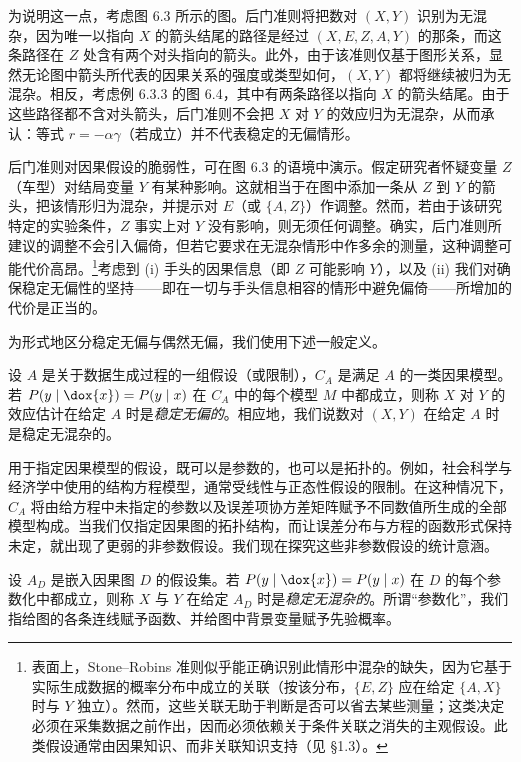 为说明这一点，考虑图 6.3 所示的图。后门准则将把数对 $(X,Y)$ 识别为无混杂，因为唯一以指向 $X$ 的箭头结尾的路径是经过 $(X,E,Z,A,Y)$ 的那条，而这条路径在 $Z$ 处含有两个对头指向的箭头。此外，由于该准则仅基于图形关系，显然无论图中箭头所代表的因果关系的强度或类型如何，$(X,Y)$ 都将继续被归为无混杂。相反，考虑例 6.3.3 的图 6.4，其中有两条路径以指向 $X$ 的箭头结尾。由于这些路径都不含对头箭头，后门准则不会把 $X$ 对 $Y$ 的效应归为无混杂，从而承认：等式 $r=-\alpha\gamma$（若成立）并不代表稳定的无偏情形。

后门准则对因果假设的脆弱性，可在图 6.3 的语境中演示。假定研究者怀疑变量 $Z$（车型）对结局变量 $Y$ 有某种影响。这就相当于在图中添加一条从 $Z$ 到 $Y$ 的箭头，把该情形归为混杂，并提示对 $E$（或 $\{A,Z\}$）作调整。然而，若由于该研究特定的实验条件，$Z$ 事实上对 $Y$ 没有影响，则无须任何调整。确实，后门准则所建议的调整不会引入偏倚，但若它要求在无混杂情形中作多余的测量，这种调整可能代价高昂。\footnote{表面上，Stone–Robins 准则似乎能正确识别此情形中混杂的缺失，因为它基于实际生成数据的概率分布中成立的关联（按该分布，$\{E,Z\}$ 应在给定 $\{A,X\}$ 时与 $Y$ 独立）。然而，这些关联无助于判断是否可以省去某些测量；这类决定必须在采集数据之前作出，因而必须依赖关于条件关联之消失的主观假设。此类假设通常由因果知识、而非关联知识支持（见 \S 1.3）。}考虑到 (i) 手头的因果信息（即 $Z$ 可能影响 $Y$），以及 (ii) 我们对确保稳定无偏性的坚持——即在一切与手头信息相容的情形中避免偏倚——所增加的代价是正当的。

为形式地区分稳定无偏与偶然无偏，我们使用下述一般定义。

\begin{definition}[稳定无偏性]
设 $A$ 是关于数据生成过程的一组假设（或限制），$C_A$ 是满足 $A$ 的一类因果模型。若 $P(y\mid \dox{x})=P(y\mid x)$ 在 $C_A$ 中的每个模型 $M$ 中都成立，则称 $X$ 对 $Y$ 的效应估计在给定 $A$ 时是\emph{稳定无偏的}。相应地，我们说数对 $(X,Y)$ 在给定 $A$ 时是稳定无混杂的。
\end{definition}

用于指定因果模型的假设，既可以是参数的，也可以是拓扑的。例如，社会科学与经济学中使用的结构方程模型，通常受线性与正态性假设的限制。在这种情况下，$C_A$ 将由给方程中未指定的参数以及误差项协方差矩阵赋予不同数值所生成的全部模型构成。当我们仅指定因果图的拓扑结构，而让误差分布与方程的函数形式保持未定，就出现了更弱的非参数假设。我们现在探究这些非参数假设的统计意涵。

\begin{definition}[结构稳定无混杂]
设 $A_D$ 是嵌入因果图 $D$ 的假设集。若 $P(y\mid \dox{x})=P(y\mid x)$ 在 $D$ 的每个参数化中都成立，则称 $X$ 与 $Y$ 在给定 $A_D$ 时是\emph{稳定无混杂的}。所谓“参数化”，我们指给图的各条连线赋予函数、并给图中背景变量赋予先验概率。
\end{definition}

